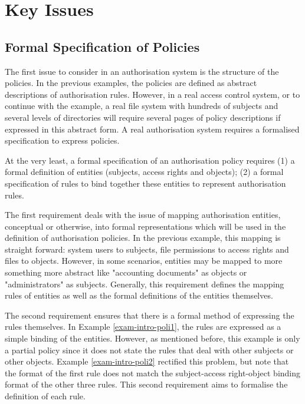 \documentclass[11pt]{report}
\begin{document}
    \section{Key Issues}
      \label{sect-intro-keyis}

      \subsection{Formal Specification of Policies}

        The first issue to consider in an authorisation system is the
        structure of the policies. In the previous examples, the policies are
        defined as abstract descriptions of authorisation rules. However, in a
        real access control system, or to continue with the example, a real
        file system with hundreds of subjects and several levels of directories
        will require several pages of policy descriptions if expressed in this
        abstract form. A real authorisation system requires a formalised
        specification to express policies.

        At the very least, a formal specification of an authorisation policy
        requires (1) a formal definition of entities (subjects, access rights
        and objects); (2) a formal specification of rules to bind together
        these entities to represent authorisation rules.

        The first requirement deals with the issue of mapping authorisation
        entities, conceptual or otherwise, into formal representations which
        will be used in the definition of authorisation policies. In the
        previous example, this mapping is straight forward: system users to
        subjects, file permissions to access rights and files to objects.
        However, in some scenarios, entities may be mapped to more something
        more abstract like "accounting documents" as objects or
        "administrators" as subjects. Generally, this requirement defines the
        mapping rules of entities as well as the formal definitions of the
        entities themselves.

        The second requirement ensures that there is a formal method of
        expressing the rules themselves. In Example \ref{exam-intro-poli1},
        the rules are expressed as a simple binding of the entities. However,
        as mentioned before, this example is only a partial policy since it
        does not state the rules that deal with other subjects or other
        objects. Example \ref{exam-intro-poli2} rectified this problem, but
        note that the format of the first rule does not match the
        subject-access right-object binding format of the other three rules.
        This second requirement aims to formalise the definition of each rule.
\end{document}
